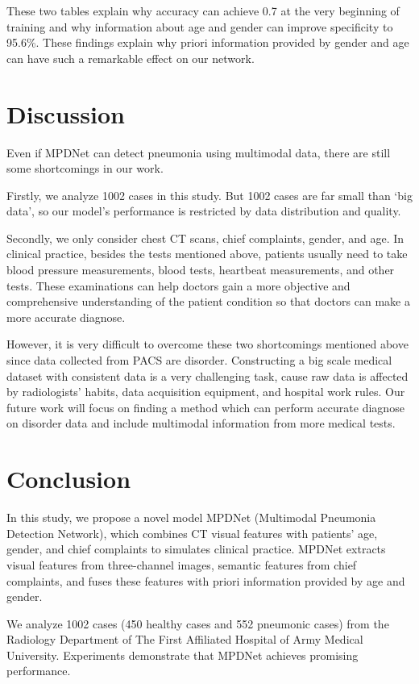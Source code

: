\documentclass[journal]{IEEEtran}
\begin{document}
These two tables explain why accuracy can achieve 0.7 at the very beginning of training and why information about age and gender can improve specificity to 95.6\%. These findings explain why priori information provided by gender and age can have such a remarkable effect on our network.


\section{Discussion}
Even if MPDNet can detect pneumonia using multimodal data, there are still some shortcomings in our work.

Firstly, we analyze 1002 cases in this study. But 1002 cases are far small than `big data', so our model's performance is restricted by data distribution and quality. 

Secondly, we only consider chest CT scans, chief complaints, gender, and age. In clinical practice, besides the tests mentioned above, patients usually need to take blood pressure measurements, blood tests, heartbeat measurements, and other tests. These examinations can help doctors gain a more objective and comprehensive understanding of the patient condition so that doctors can make a more accurate diagnose.

However, it is very difficult to overcome these two shortcomings mentioned above since data collected from PACS are disorder. Constructing a big scale medical dataset with consistent data is a very challenging task, cause raw data is affected by radiologists' habits, data acquisition equipment, and hospital work rules. 
Our future work will focus on finding a method which can perform accurate diagnose on disorder data and include multimodal information from more medical tests.

\section{Conclusion}
\label{conclude}
In this study, we propose a novel model MPDNet (Multimodal Pneumonia Detection Network), which combines CT visual features with patients' age, gender, and chief complaints to simulates clinical practice. 
MPDNet extracts visual features from three-channel images, semantic features from chief complaints, and fuses these features with priori information provided by age and gender.

We analyze 1002 cases (450 healthy cases and 552 pneumonic cases) from the Radiology Department of The First Affiliated Hospital of Army Medical University. Experiments demonstrate that MPDNet achieves promising performance.
\end{document}
